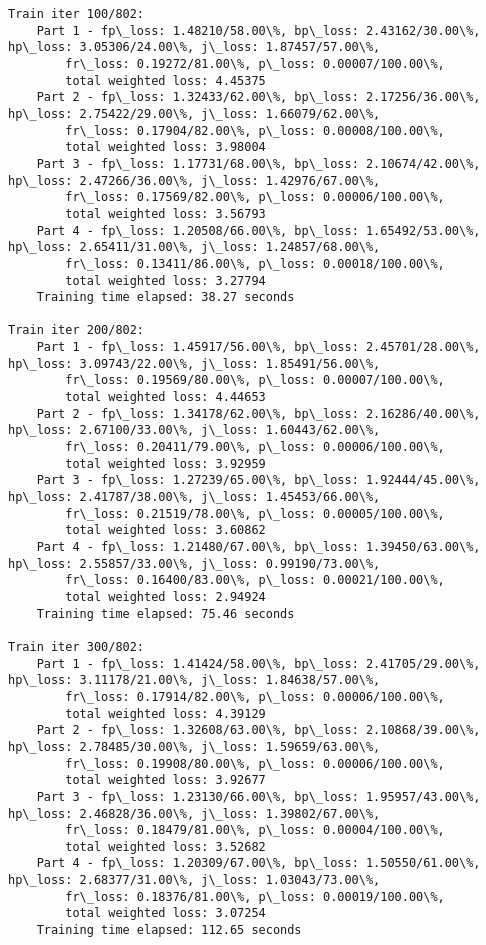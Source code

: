 \documentclass[11pt]{article}
\begin{document}
\begin{Verbatim}[commandchars=\\\{\}]
Train iter 100/802:
	Part 1 - fp\_loss: 1.48210/58.00\%, bp\_loss: 2.43162/30.00\%, hp\_loss: 3.05306/24.00\%, j\_loss: 1.87457/57.00\%, 
		fr\_loss: 0.19272/81.00\%, p\_loss: 0.00007/100.00\%, 
		total weighted loss: 4.45375
	Part 2 - fp\_loss: 1.32433/62.00\%, bp\_loss: 2.17256/36.00\%, hp\_loss: 2.75422/29.00\%, j\_loss: 1.66079/62.00\%, 
		fr\_loss: 0.17904/82.00\%, p\_loss: 0.00008/100.00\%, 
		total weighted loss: 3.98004
	Part 3 - fp\_loss: 1.17731/68.00\%, bp\_loss: 2.10674/42.00\%, hp\_loss: 2.47266/36.00\%, j\_loss: 1.42976/67.00\%, 
		fr\_loss: 0.17569/82.00\%, p\_loss: 0.00006/100.00\%, 
		total weighted loss: 3.56793
	Part 4 - fp\_loss: 1.20508/66.00\%, bp\_loss: 1.65492/53.00\%, hp\_loss: 2.65411/31.00\%, j\_loss: 1.24857/68.00\%, 
		fr\_loss: 0.13411/86.00\%, p\_loss: 0.00018/100.00\%, 
		total weighted loss: 3.27794
	Training time elapsed: 38.27 seconds

Train iter 200/802:
	Part 1 - fp\_loss: 1.45917/56.00\%, bp\_loss: 2.45701/28.00\%, hp\_loss: 3.09743/22.00\%, j\_loss: 1.85491/56.00\%, 
		fr\_loss: 0.19569/80.00\%, p\_loss: 0.00007/100.00\%, 
		total weighted loss: 4.44653
	Part 2 - fp\_loss: 1.34178/62.00\%, bp\_loss: 2.16286/40.00\%, hp\_loss: 2.67100/33.00\%, j\_loss: 1.60443/62.00\%, 
		fr\_loss: 0.20411/79.00\%, p\_loss: 0.00006/100.00\%, 
		total weighted loss: 3.92959
	Part 3 - fp\_loss: 1.27239/65.00\%, bp\_loss: 1.92444/45.00\%, hp\_loss: 2.41787/38.00\%, j\_loss: 1.45453/66.00\%, 
		fr\_loss: 0.21519/78.00\%, p\_loss: 0.00005/100.00\%, 
		total weighted loss: 3.60862
	Part 4 - fp\_loss: 1.21480/67.00\%, bp\_loss: 1.39450/63.00\%, hp\_loss: 2.55857/33.00\%, j\_loss: 0.99190/73.00\%, 
		fr\_loss: 0.16400/83.00\%, p\_loss: 0.00021/100.00\%, 
		total weighted loss: 2.94924
	Training time elapsed: 75.46 seconds

Train iter 300/802:
	Part 1 - fp\_loss: 1.41424/58.00\%, bp\_loss: 2.41705/29.00\%, hp\_loss: 3.11178/21.00\%, j\_loss: 1.84638/57.00\%, 
		fr\_loss: 0.17914/82.00\%, p\_loss: 0.00006/100.00\%, 
		total weighted loss: 4.39129
	Part 2 - fp\_loss: 1.32608/63.00\%, bp\_loss: 2.10868/39.00\%, hp\_loss: 2.78485/30.00\%, j\_loss: 1.59659/63.00\%, 
		fr\_loss: 0.19908/80.00\%, p\_loss: 0.00006/100.00\%, 
		total weighted loss: 3.92677
	Part 3 - fp\_loss: 1.23130/66.00\%, bp\_loss: 1.95957/43.00\%, hp\_loss: 2.46828/36.00\%, j\_loss: 1.39802/67.00\%, 
		fr\_loss: 0.18479/81.00\%, p\_loss: 0.00004/100.00\%, 
		total weighted loss: 3.52682
	Part 4 - fp\_loss: 1.20309/67.00\%, bp\_loss: 1.50550/61.00\%, hp\_loss: 2.68377/31.00\%, j\_loss: 1.03043/73.00\%, 
		fr\_loss: 0.18376/81.00\%, p\_loss: 0.00019/100.00\%, 
		total weighted loss: 3.07254
	Training time elapsed: 112.65 seconds


\end{Verbatim}
\end{document}

